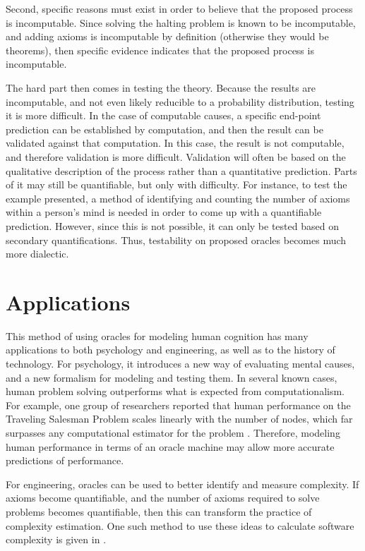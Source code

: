 Second, specific reasons must exist in order to believe that the proposed process is incomputable.  Since solving the halting problem is known to be incomputable, and adding axioms is incomputable by definition (otherwise they would be theorems), then specific evidence indicates that the proposed process is incomputable.  

The hard part then comes in testing the theory.  Because the results are incomputable, and not even likely reducible to a probability distribution, testing it is more difficult.  In the case of computable causes, a specific end-point prediction can be established by computation, and then the result can be validated against that computation.  In this case, the result is not computable, and therefore validation is more difficult.  Validation will often be based on the qualitative description of the process rather than a quantitative prediction.  Parts of it may still be quantifiable, but only with difficulty.  For instance, to test the example presented, a method of identifying and counting the number of axioms within a person's mind is needed in order to come up with a quantifiable prediction.  However, since this is not possible, it can only be tested based on secondary quantifications.  Thus, testability on proposed oracles becomes much more dialectic.

\section{Applications}

This method of using oracles for modeling human cognition has many applications to both psychology and engineering, as well as to the history of technology.  For psychology, it introduces a new way of evaluating mental causes, and a new formalism for modeling and testing them.  In several known cases, human problem solving outperforms what is expected from computationalism.  For example, one group of researchers
reported that human performance on the Traveling Salesman Problem scales linearly with the number of nodes, which far surpasses any computational estimator for the problem .  Therefore, modeling human performance in terms of an oracle machine may allow more accurate predictions of performance.

For engineering, oracles can be used to better identify and measure complexity.  If axioms become quantifiable, and the number of axioms required to solve problems becomes quantifiable, then this can transform the practice of complexity estimation.  One such method to use these ideas to calculate software complexity is given in \citet{bartlett2012}.  

